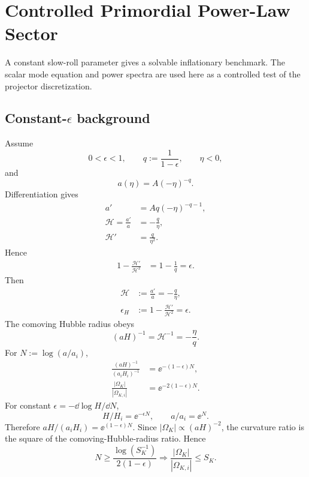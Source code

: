 \chapter{Controlled Primordial Power-Law Sector}

A constant slow-roll parameter gives a solvable inflationary benchmark.  The scalar mode equation and power spectra are used here as a controlled test of the projector discretization.

\allowdisplaybreaks

\section[Constant-epsilon background]{Constant-\(\epsilon\) background}
Assume
\begin{equation}
0<\epsilon<1,
\qquad
q:=\frac{1}{1-\epsilon},
\qquad
\eta<0,
\end{equation}
and
\begin{equation}
\boxed{
a(\eta)=A(-\eta)^{-q}.
}
\end{equation}
Differentiation gives
\begin{align}
a'&=Aq(-\eta)^{-q-1},\\
\mathcal H=\frac{a'}a&=-\frac q\eta,\\
\mathcal H'&=\frac q{\eta^2}.
\end{align}
Hence
\begin{align}
1-\frac{\mathcal H'}{\mathcal H^2}
&=
1-\frac1q
=\epsilon.
\end{align}
Then
\begin{align}
\mathcal H&:=\frac{a'}a=-\frac q\eta,\\
\epsilon_H&:=1-\frac{\mathcal H'}{\mathcal H^2}=\epsilon.
\end{align}
The comoving Hubble radius obeys
\begin{equation}
(aH)^{-1}=\mathcal H^{-1}=-\frac{\eta}{q}.
\end{equation}
For \(N:=\log(a/a_i)\),
\begin{align}
\frac{(aH)^{-1}}{(a_iH_i)^{-1}}
&=\ee^{-(1-\epsilon)N},\\
\frac{|\Omega_K|}{|\Omega_{K,i}|}
&=\ee^{-2(1-\epsilon)N}.
\end{align}
For constant \(\epsilon=-\dd\log H/\dd N\),
\begin{equation}
H/H_i=\ee^{-\epsilon N},
\qquad
a/a_i=\ee^N.
\end{equation}
Therefore \(aH/(a_iH_i)=\ee^{(1-\epsilon)N}\).  Since
\(|\Omega_K|\propto(aH)^{-2}\), the curvature ratio is the square of the comoving-Hubble-radius ratio.
Hence
\begin{equation}
N\geq\frac{\log(S_K^{-1})}{2(1-\epsilon)}
\Longrightarrow
\frac{|\Omega_K|}{|\Omega_{K,i}|}\leq S_K.
\end{equation}

